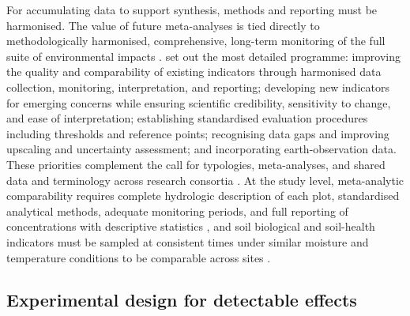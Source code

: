 \documentclass[11pt]{article}
\begin{document}
For accumulating data to support synthesis, methods and reporting must be
harmonised. The value of future meta-analyses is tied directly to
methodologically harmonised, comprehensive, long-term monitoring of the full
suite of environmental impacts \parencite{Wu2025}. \textcite{Zhang2018} set
out the most detailed programme: improving the quality and comparability of
existing indicators through harmonised data collection, monitoring,
interpretation, and reporting; developing new indicators for emerging
concerns while ensuring scientific credibility, sensitivity to change, and
ease of interpretation; establishing standardised evaluation procedures
including thresholds and reference points; recognising data gaps and
improving upscaling and uncertainty assessment; and incorporating
earth-observation data. These priorities complement the call for typologies,
meta-analyses, and shared data and terminology across research consortia
\parencite{Rogger2017}. At the study level, meta-analytic comparability
requires complete hydrologic description of each plot, standardised
analytical methods, adequate monitoring periods, and full reporting of
concentrations with descriptive statistics \parencite{Ghirardini2019}, and
soil biological and soil-health indicators must be sampled at consistent
times under similar moisture and temperature conditions to be comparable
across sites \parencite{Sherbine2023,Li2023b}.

\subsection{Experimental design for detectable effects}
\end{document}
